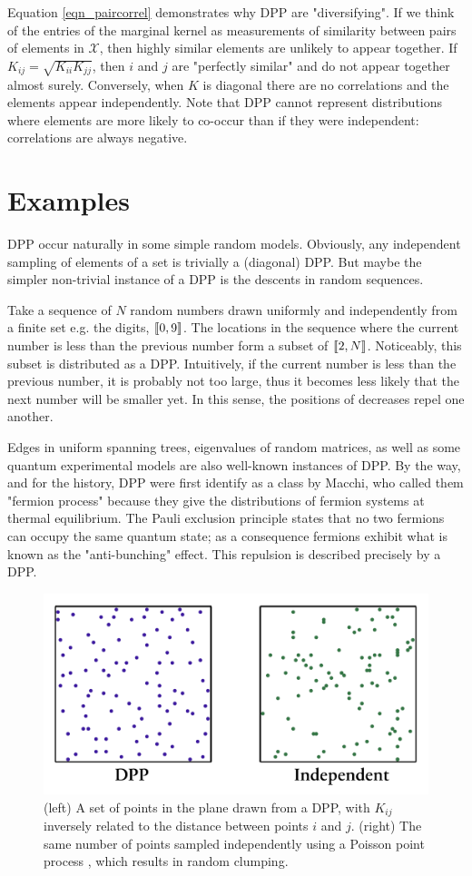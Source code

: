 Equation \ref{eqn_paircorrel} demonstrates why DPP are "diversifying". If we think of the entries of the marginal kernel as measurements of similarity between pairs of elements in $\mathcal{X}$, then highly similar elements are unlikely to appear together. If $K_{i j}=\sqrt{K_{i i} K_{j j}}$, then $i$ and $j$ are "perfectly similar" and do not appear together almost surely. Conversely, when $K$ is diagonal there are no correlations and the elements appear independently. Note that DPP cannot represent distributions where elements are more likely to co-occur than if they were independent: correlations are always negative.


\section{Examples}

DPP occur naturally in some simple random models. Obviously, any independent sampling of elements of a set is trivially a (diagonal) DPP. But maybe the simpler non-trivial instance of a DPP is the descents in random sequences.


Take a sequence of $N$ random numbers drawn uniformly and independently from a finite set e.g. the digits, $\llbracket 0,9 \rrbracket$. The locations in the sequence where the current number is less than the previous number form a subset of  $\llbracket 2,N \rrbracket$. Noticeably, this subset is distributed as a DPP. Intuitively, if the current number is less than the previous number, it is probably not too large, thus it becomes less likely that the next number will be smaller yet. In this sense, the positions of decreases repel one another.

Edges in uniform spanning trees, eigenvalues of random matrices, as well as some quantum experimental models are also well-known instances of DPP. By the way, and for the history, DPP were first identify as a class by Macchi, who called them "fermion process" because they give the distributions of fermion systems at thermal equilibrium. The Pauli exclusion principle states that no two fermions can occupy the same quantum state; as a consequence fermions exhibit what is known as the "anti-bunching" effect. This repulsion is described precisely by a DPP.

\begin{figure}[!ht]
    \centering
    \includegraphics[width=0.6\linewidth]{pics/dpp_vs_iid.png}
    \caption{(left) A set of points in the plane drawn from a DPP, with $K_{i j}$ inversely related to the distance between points $i$ and $j$. (right) The same number of points sampled independently using a Poisson point process , which results in random clumping.}
    \label{fig_dpp_vs_iid}
\end{figure}



